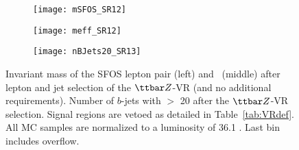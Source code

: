 \begin{figure}[t!]
\centering
\begin{subfigure}[t]{0.32\textwidth}
\texttt{[image: mSFOS\_SR12]}
\end{subfigure}
\begin{subfigure}[t]{0.32\textwidth}
\texttt{[image: meff\_SR12]}
\end{subfigure}
\begin{subfigure}[t]{0.32\textwidth}
\texttt{[image: nBJets20\_SR13]}
\end{subfigure}
\caption{Invariant mass of the SFOS lepton pair (left) and \meff\ (middle) after lepton and jet selection of the $\ttbar Z$-VR (and no additional requirements). Number of $b$-jets with \pt $>$ 20 \GeV after the $\ttbar Z$-VR selection. Signal regions are vetoed as detailed in Table~\ref{tab:VRdef}. All MC samples are normalized to a luminosity of 36.1 \ifb. Last bin includes overflow.
}
\label{fig:ttZ_VR_afterLepJetSel}
\end{figure} 


